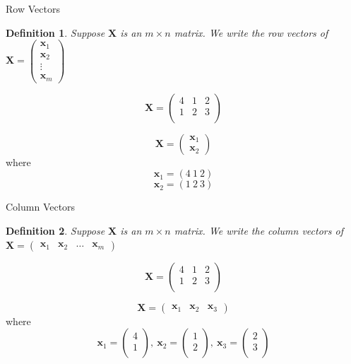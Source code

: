 \documentclass{beamer}
\newtheorem{defn}{Definition}
\numberwithin{equation}{section}
\begin{document}
\begin{frame}{Row Vectors}

\begin{defn} Suppose $\boldsymbol{X}$ is an $m \times n$ matrix. We write the row vectors of $\boldsymbol{X} = \begin{pmatrix} \boldsymbol{x}_{1} \\ \boldsymbol{x}_{2} \\ \vdots\\ \boldsymbol{x}_{m} \end{pmatrix} $ 
\end{defn}

$$\boldsymbol{X} = \begin{pmatrix} 4 & 1 & 2 \\1 & 2  & 3 \\ \end{pmatrix} $$

$$\boldsymbol{X} = \begin{pmatrix} \boldsymbol{x}_{1}  \\\boldsymbol{x}_{2} \end{pmatrix} $$ 
where
$$\boldsymbol{x}_{1}=(4\  1\  2)$$
$$\boldsymbol{x}_{2}=(1\  2\  3)$$

\end{frame}


\begin{frame}{Column Vectors}

\begin{defn} Suppose $\boldsymbol{X}$ is an $m \times n$ matrix. We write the column vectors of $\boldsymbol{X} = \begin{pmatrix} \boldsymbol{x}_{1} & \boldsymbol{x}_{2} & \ldots& \boldsymbol{x}_{m} \end{pmatrix} $ 
\end{defn}

$$\boldsymbol{X} = \begin{pmatrix} 4 & 1 & 2 \\1 & 2  & 3 \\ \end{pmatrix} $$

$$\boldsymbol{X} = \begin{pmatrix} \boldsymbol{x}_{1}  & \boldsymbol{x}_{2} & \boldsymbol{x}_{3} \end{pmatrix} $$ 
where
$$\boldsymbol{x}_{1}= \begin{pmatrix} 4 \\1  \\ \end{pmatrix}, \ \boldsymbol{x}_{2}=\begin{pmatrix} 1 \\2\\ \end{pmatrix}, \ \boldsymbol{x}_{3}=\begin{pmatrix} 2 \\3\\ \end{pmatrix}$$

\end{frame}
\end{document}
